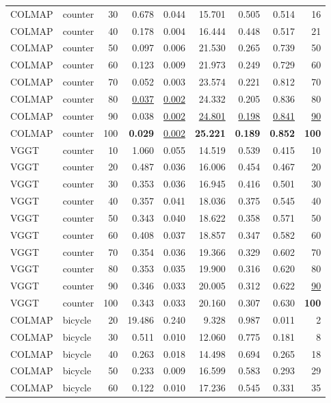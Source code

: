 \begin{table}[H]
\begin{tabular}{llrrrrrrr}
COLMAP & counter & 30 & 0.678 & 0.044 & 15.701 & 0.505 & 0.514 & 16 \\
COLMAP & counter & 40 & 0.178 & 0.004 & 16.444 & 0.448 & 0.517 & 21 \\
COLMAP & counter & 50 & 0.097 & 0.006 & 21.530 & 0.265 & 0.739 & 50 \\
COLMAP & counter & 60 & 0.123 & 0.009 & 21.973 & 0.249 & 0.729 & 60 \\
COLMAP & counter & 70 & 0.052 & 0.003 & 23.574 & 0.221 & 0.812 & 70 \\
COLMAP & counter & 80 & \underline{0.037} & \underline{0.002} & 24.332 & 0.205 & 0.836 & 80 \\
COLMAP & counter & 90 & 0.038 & \underline{0.002} & \underline{24.801} & \underline{0.198} & \underline{0.841} & \underline{90} \\
COLMAP & counter & 100 & \textbf{0.029} & \underline{0.002} & \textbf{25.221} & \textbf{0.189} & \textbf{0.852} & \textbf{100} \\
VGGT & counter & 10 & 1.060 & 0.055 & 14.519 & 0.539 & 0.415 & 10 \\
VGGT & counter & 20 & 0.487 & 0.036 & 16.006 & 0.454 & 0.467 & 20 \\
VGGT & counter & 30 & 0.353 & 0.036 & 16.945 & 0.416 & 0.501 & 30 \\
VGGT & counter & 40 & 0.357 & 0.041 & 18.036 & 0.375 & 0.545 & 40 \\
VGGT & counter & 50 & 0.343 & 0.040 & 18.622 & 0.358 & 0.571 & 50 \\
VGGT & counter & 60 & 0.408 & 0.037 & 18.857 & 0.347 & 0.582 & 60 \\
VGGT & counter & 70 & 0.354 & 0.036 & 19.366 & 0.329 & 0.602 & 70 \\
VGGT & counter & 80 & 0.353 & 0.035 & 19.900 & 0.316 & 0.620 & 80 \\
VGGT & counter & 90 & 0.346 & 0.033 & 20.005 & 0.312 & 0.622 & \underline{90} \\
VGGT & counter & 100 & 0.343 & 0.033 & 20.160 & 0.307 & 0.630 & \textbf{100} \\
\midrule
COLMAP & bicycle & 20 & 19.486 & 0.240 & 9.328 & 0.987 & 0.011 & 2 \\
COLMAP & bicycle & 30 & 0.511 & 0.010 & 12.060 & 0.775 & 0.181 & 8 \\
COLMAP & bicycle & 40 & 0.263 & 0.018 & 14.498 & 0.694 & 0.265 & 18 \\
COLMAP & bicycle & 50 & 0.233 & 0.009 & 16.599 & 0.583 & 0.293 & 29 \\
COLMAP & bicycle & 60 & 0.122 & 0.010 & 17.236 & 0.545 & 0.331 & 35 \\

\end{tabular}
\end{table}
